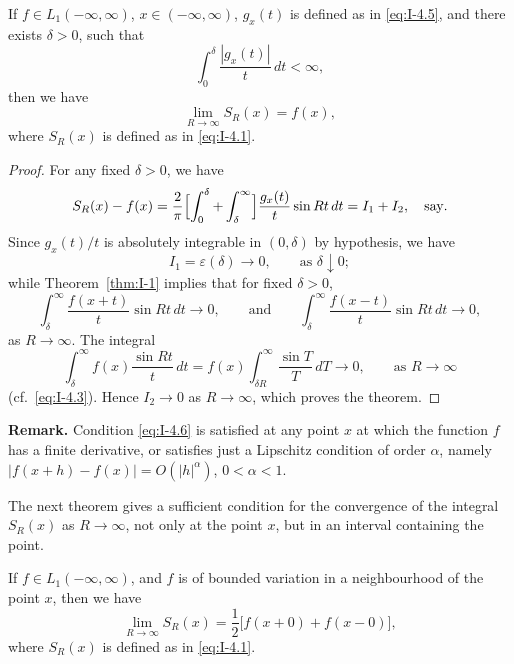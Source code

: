 \begin{theorem}\label{thm:I-4}
If $f\in L_1(-\infty,\infty)$, $x\in(-\infty,\infty)$, $g_x(t)$ is defined as in \eqref{eq:I-4.5}, and there exists $\delta>0$, such that
\begin{equation}\label{eq:I-4.6}
\int_0^\delta\frac{|g_x(t)|}{t}\,dt<\infty,
\end{equation}
then we have
\begin{equation*}
\lim_{R\to\infty}S_R(x)=f(x),
\end{equation*}
where $S_R(x)$ is defined as in \eqref{eq:I-4.1}.
\end{theorem}

\begin{proof}
For any fixed $\delta>0$, we have
\begin{equation*}
S_R(x)-f(x)=\frac{2}{\pi}\Bigl[\int_0^\delta+\int_\delta^\infty\Bigr]\frac{g_x(t)}{t}\sin Rt\,dt
=I_1+I_2,\quad\text{say}.
\end{equation*}
Since $g_x(t)/t$ is absolutely integrable in $(0,\delta)$ by hypothesis, we have
\begin{equation*}
I_1=\varepsilon(\delta)\to 0,\qquad\text{as }\delta\downarrow 0;
\end{equation*}
while Theorem~\ref{thm:I-1} implies that for fixed $\delta>0$,
\begin{equation*}
\int_\delta^\infty\frac{f(x+t)}{t}\sin Rt\,dt\to 0,
\qquad\text{and}\qquad
\int_\delta^\infty\frac{f(x-t)}{t}\sin Rt\,dt\to 0,
\end{equation*}
as $R\to\infty$. The integral
\begin{equation*}
\int_\delta^\infty f(x)\frac{\sin Rt}{t}\,dt
=f(x)\int_{\delta R}^\infty\frac{\sin T}{T}\,dT\to 0,
\qquad\text{as }R\to\infty
\end{equation*}
(cf.\ \eqref{eq:I-4.3}). Hence $I_2\to 0$ as $R\to\infty$, which proves the theorem.
\end{proof}

\noindent\textbf{Remark.}
Condition \eqref{eq:I-4.6} is satisfied at any point $x$ at which the function $f$ has a finite derivative, or satisfies just a Lipschitz condition of order $\alpha$, namely $|f(x+h)-f(x)|=O(|h|^\alpha)$, $0<\alpha<1$.

The next theorem gives a sufficient condition for the convergence of the integral $S_R(x)$ as $R\to\infty$, not only at the point $x$, but in an interval containing the point.

\begin{theorem}\label{thm:I-5}
If $f\in L_1(-\infty,\infty)$, and $f$ is of bounded variation in a neighbourhood of the point $x$, then we have
\begin{equation*}
\lim_{R\to\infty}S_R(x)=\frac12\bigl[f(x+0)+f(x-0)\bigr],
\end{equation*}
where $S_R(x)$ is defined as in \eqref{eq:I-4.1}.
\end{theorem}

